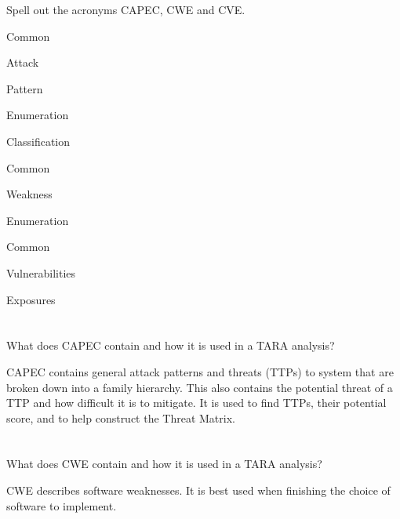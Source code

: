 \begin{questions}
\question{} Spell out the acronyms CAPEC, CWE and CVE.\@
  \begin{solution}
    \begin{description}[noitemsep]
    \item[C] Common
    \item[A] Attack
    \item[P] Pattern
    \item[E] Enumeration
    \item[C] Classification
    \end{description}

    \begin{description}[noitemsep]
    \item[C] Common
    \item[W] Weakness
    \item[E] Enumeration
    \end{description}

    \begin{description}[noitemsep]
    \item[C] Common
    \item[V] Vulnerabilities
    \item[E] Exposures
    \end{description}
  \end{solution}

  \begin{parts}
  \part{} What does CAPEC contain and how it is used in a TARA analysis?
    \begin{solution}
      CAPEC contains general attack patterns and threats (TTPs) to system that are broken down into a family hierarchy.
      This also contains the potential threat of a TTP and how difficult it is to mitigate.
      It is used to find TTPs, their potential score, and to help construct the Threat Matrix.
    \end{solution}

  \part{} What does CWE contain and how it is used in a TARA analysis?
    \begin{solution}
      CWE describes software weaknesses.
      It is best used when finishing the choice of software to implement.
    \end{solution}


\end{parts}
\end{questions}

